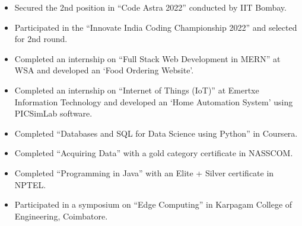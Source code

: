 \documentclass[11pt, a4paper]{article}
\begin{document}
{\begin{minipage}{0.5\textwidth}
\begin{tcolorbox}[
            height=0.982\textheight, 
            grow to right by=1.5cm, 
            colback=white,
            colframe=white,
            arc=0mm
        ]
            \vspace*{-0.2cm}
            \begin{itemize}[itemsep=0.007cm,leftmargin=*]
                \item Secured the 2nd position in “Code Astra 2022” conducted by IIT Bombay.
                \item Participated in the “Innovate India Coding Championship 2022” and selected for 2nd round.
                \item Completed an internship on “Full Stack Web Development in MERN” at WSA and developed an ‘Food Ordering Website’.
                \item Completed an internship on “Internet of Things (IoT)” at Emertxe Information Technology and developed an ‘Home Automation System’ using PICSimLab software.  
                \item Completed “Databases and SQL for Data Science using Python” in Coursera.
                \item Completed “Acquiring Data” with a gold category certificate in NASSCOM.
                \item Completed “Programming in Java” with an Elite + Silver certificate in NPTEL.
                \item Participated in a symposium on “Edge Computing” in Karpagam College of Engineering, Coimbatore.
            \end{itemize}

        \end{tcolorbox}
    \end{minipage}}

    \newpage
    \pagestyle{headerOnly} %
\end{document}
